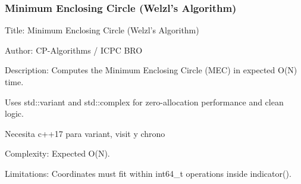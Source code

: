 \documentclass[10pt,landscape,twocolumn]{article}
\begin{document}
\subsubsection{Minimum Enclosing Circle (Welzl's Algorithm)}
\begin{flushleft}
\footnotesize\ttfamily
\par\noindent Title: Minimum Enclosing Circle (Welzl's Algorithm)
\par\noindent Author: CP-Algorithms / ICPC BRO
\par\noindent Description: Computes the Minimum Enclosing Circle (MEC) in expected O(N) time.
\par\noindent Uses std::variant and std::complex for zero-allocation performance and clean logic.
\par\noindent Necesita c++17 para variant, visit y chrono
\par\noindent Complexity: Expected O(N).
\par\noindent Limitations: Coordinates must fit within int64\_t operations inside indicator().
\end{flushleft}
\end{document}
